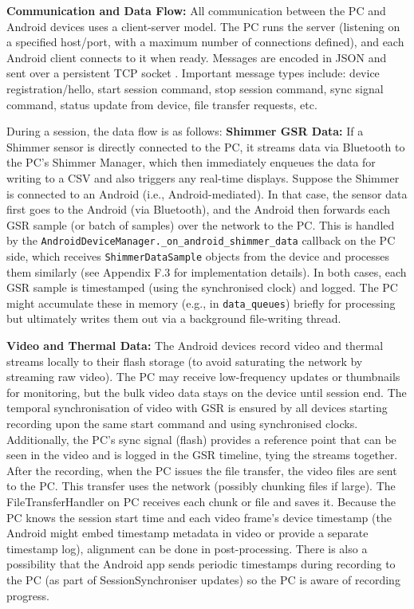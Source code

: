 \textbf{Communication and Data Flow:} All communication between the PC and Android devices uses a client-server model. The PC runs the server (listening on a specified host/port, with a maximum number of connections defined), and each Android client connects to it when ready. Messages are encoded in JSON and sent over a persistent TCP socket \cite{ref21}. Important message types include: device registration/hello, start session command, stop session command, sync signal command, status update from device, file transfer requests, etc.

During a session, the data flow is as follows: \textbf{Shimmer GSR Data:} If a Shimmer sensor is directly connected to the PC, it streams data via Bluetooth to the PC's Shimmer Manager, which then immediately enqueues the data for writing to a CSV and also triggers any real-time displays. Suppose the Shimmer is connected to an Android (i.e., Android-mediated). In that case, the sensor data first goes to the Android (via Bluetooth), and the Android then forwards each GSR sample (or batch of samples) over the network to the PC. This is handled by the \texttt{AndroidDeviceManager.\_on\_android\_shimmer\_data} callback on the PC side, which receives \texttt{ShimmerDataSample} objects from the device and processes them similarly (see Appendix F.3 for implementation details). In both cases, each GSR sample is timestamped (using the synchronised clock) and logged. The PC might accumulate these in memory (e.g., in \texttt{data\_queues}) briefly for processing but ultimately writes them out via a background file-writing thread.

\textbf{Video and Thermal Data:} The Android devices record video and thermal streams locally to their flash storage (to avoid saturating the network by streaming raw video). The PC may receive low-frequency updates or thumbnails for monitoring, but the bulk video data stays on the device until session end. The temporal synchronisation of video with GSR is ensured by all devices starting recording upon the same start command and using synchronised clocks. Additionally, the PC's sync signal (flash) provides a reference point that can be seen in the video and is logged in the GSR timeline, tying the streams together. After the recording, when the PC issues the file transfer, the video files are sent to the PC. This transfer uses the network (possibly chunking files if large). The FileTransferHandler on PC receives each chunk or file and saves it. Because the PC knows the session start time and each video frame's device timestamp (the Android might embed timestamp metadata in video or provide a separate timestamp log), alignment can be done in post-processing. There is also a possibility that the Android app sends periodic timestamps during recording to the PC (as part of SessionSynchroniser updates) so the PC is aware of recording progress.

